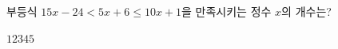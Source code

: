 부등식 $15x-24<5x+6\le 10x+1$을 만족시키는 정수 $x$의 개수는?
\begin{choices32}{$1$}{$2$}{$3$}{$4$}{$5$}\end{choices32}
